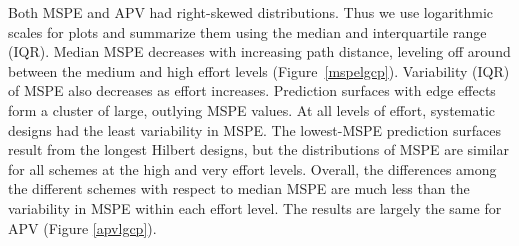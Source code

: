\documentclass[review]{elsarticle}
\begin{document}
Both MSPE and APV had right-skewed distributions. Thus we use logarithmic
scales for plots and summarize them using the median and interquartile range
(IQR). Median MSPE decreases with increasing path distance, leveling off
around between the medium and high effort levels (Figure~\ref{mspelgcp}).
Variability (IQR) of MSPE also decreases as effort increases. Prediction
surfaces with edge effects form a cluster of large, outlying MSPE values. At
all levels of effort, systematic designs had the least variability in MSPE.
The lowest-MSPE prediction surfaces result from the longest Hilbert designs,
but the distributions of MSPE are similar for all schemes at the high and very
effort levels. Overall, the differences among the different schemes with
respect to median MSPE are much less than the variability in MSPE within each
effort level. The results are largely the same for APV (Figure \ref{apvlgcp}).



\end{document}
